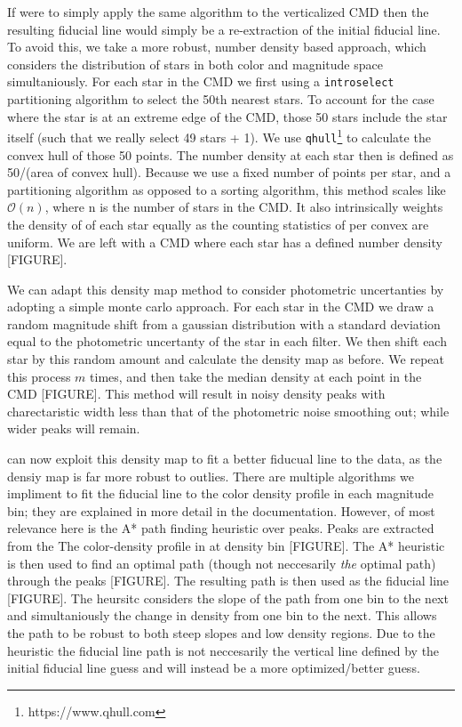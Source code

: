 If \fidanka were to simply apply the same algorithm to the verticalized CMD
then the resulting fiducial line would simply be a re-extraction of the initial
fiducial line. To avoid this, we take a more robust, number density based
approach, which considers the distribution of stars in both color and magnitude
space simultaniously. For each star in the CMD we first using a
\texttt{introselect} partitioning algorithm to select the 50th nearest stars.
To account for the case where the star is at an extreme edge of the CMD, those
50 stars include the star itself (such that we really select 49 stars + 1). We
use \texttt{qhull}\footnote{https://www.qhull.com}\citep{Barber1996, } to
calculate the convex hull of those 50 points. The number density at each star
then is defined as 50/(area of convex hull). Because we use a fixed number of
points per star, and a partitioning algorithm as opposed to a sorting
algorithm, this method scales like $\mathcal{O}(n)$, where n is the number of
stars in the CMD. It also intrinsically weights the density of of each star
equally as the counting statistics of per convex are uniform. We are left with a
CMD where each star has a defined number density {\color{red}[FIGURE]}.

We can adapt this density map method to consider photometric uncertanties by
adopting a simple monte carlo approach. For each star in the CMD we draw a
random magnitude shift from a gaussian distribution with a standard deviation
equal to the photometric uncertanty of the star in each filter. We then shift
each star by this random amount and calculate the density map as before. We
repeat this process $m$ times, and then take the median density at each point
in the CMD {\color{red}[FIGURE]}. This method will result in noisy density
peaks with charectaristic width less than that of the photometric noise
smoothing out; while wider peaks will remain.

\fidanka can now exploit this density map to fit a better fiducual line to the
data, as the densiy map is far more robust to outlies. There are multiple
algorithms we impliment to fit the fiducial line to the color density profile
in each magnitude bin; they are explained in more detail in the \fidanka
documentation. However, of most relevance here is the A* path finding heuristic
over peaks. Peaks are extracted from the The color-density profile in at
density bin {\color{red}[FIGURE]}. The A* heuristic is then used to find an
optimal path (though not neccesarily {\em the} optimal path) through the peaks
{\color{red}[FIGURE]}. The resulting path is then used as the fiducial line
{\color{red}[FIGURE]}. The heursitc considers the slope of the path from one
bin to the next and simultaniously the change in density from one bin to the
next. This allows the path to be robust to both steep slopes and low density
regions. Due to the heuristic the fiducial line path  is not neccesarily the
vertical line defined by the initial fiducial line guess and will instead be a
more optimized/better guess.

